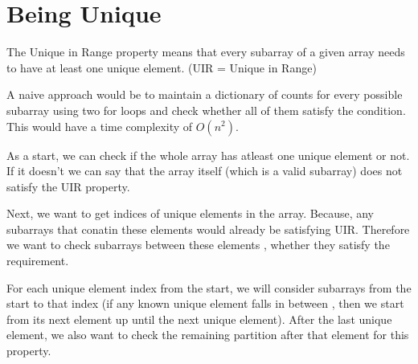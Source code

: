 \documentclass{article}[12pt]
\begin{document}
\section{Being Unique }

The Unique in Range property means that every subarray of a given array needs to have at least one unique element.  
(UIR = Unique in Range)

A naive approach would be to maintain a dictionary of counts for every possible subarray using two for loops and check whether all of them satisfy the condition. This would have a time complexity of $O(n^2)$.

As a start, we can check if the whole array has atleast one unique element or not. If it doesn't we can say that the array itself (which is a valid subarray) does not satisfy the UIR property.

Next, we want to get indices of unique elements in the array. Because, any subarrays that conatin these elements would already be satisfying UIR.
Therefore we want to check subarrays between these elements , whether they satisfy the requirement. 

For each unique element index from the start, we will consider subarrays from the start to that index (if any known unique element falls in between , then we start from its next element up until the next unique element). After the last unique element, we also want to check the remaining partition after that element for this property. \\
\end{document}
